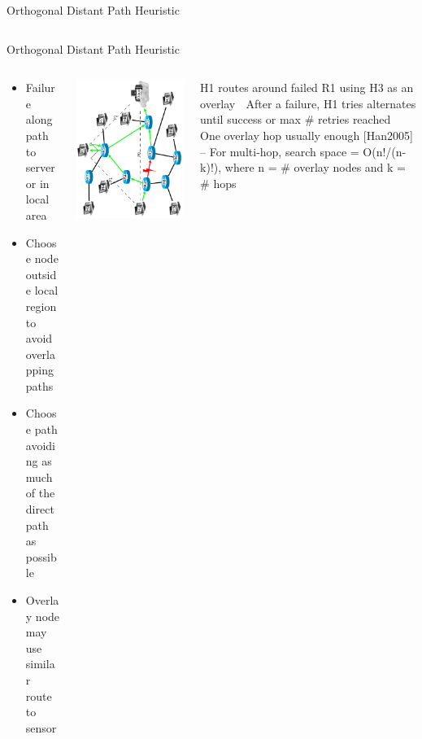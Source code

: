 \documentclass[pdftex]{beamer}
\begin{document}
\begin{frame}{Orthogonal Distant Path Heuristic}
\begin{columns}
\begin{frame}{Orthogonal Distant Path Heuristic}
\begin{columns}
\begin{column}{.5\textwidth}

\begin{itemize}
	\item Failure along path to server or in local area
	\item Choose node outside local	region to avoid overlapping	paths
	\item Choose path avoiding as much of the direct path as possible
	\item Overlay node may use similar route to sensor
\end{itemize}
\end{column}
	
\begin{column}{.5\textwidth}
\includegraphics[height=\textwidth,angle=-90]{angular_path}
\end{column}
H1 routes around failed R1
using H3 as an overlay
 After a failure, H1 tries
alternates until success or max
# retries reached
 One overlay hop usually
enough [Han2005]
– For multi-hop, search
space = O(n!/(n-k)!),
where n = # overlay
nodes and k = # hops



\end{columns}
\end{frame}



\end{columns}
\end{frame}
\end{document}
